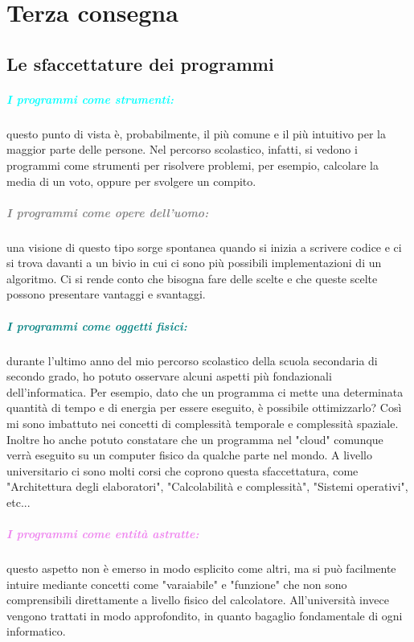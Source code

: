 \chapter{Terza consegna}

\section{Le sfaccettature dei programmi}

\paragraph{\textcolor{cyan}{I programmi come strumenti:}} 
questo punto di vista è, probabilmente, il più comune e il più intuitivo 
per la maggior parte delle persone. Nel percorso scolastico, infatti,
si vedono i programmi come strumenti per risolvere problemi, per esempio,
calcolare la media di un voto, oppure per svolgere un compito.

\paragraph{\textcolor{gray}{I programmi come opere dell'uomo:}}
una visione di questo tipo sorge spontanea quando si inizia a scrivere
codice e ci si trova davanti a un bivio in cui ci sono più possibili 
implementazioni di un algoritmo. Ci si rende conto che bisogna
fare delle scelte e che queste scelte possono presentare vantaggi e
svantaggi.

\paragraph{\textcolor{teal}{I programmi come oggetti fisici:}} 
durante l'ultimo anno del mio percorso scolastico della scuola
secondaria di secondo grado, ho potuto osservare alcuni aspetti più
fondazionali dell'informatica. Per esempio, dato che un programma ci
mette una determinata quantità di tempo e di energia per essere eseguito,
è possibile ottimizzarlo? Così mi sono imbattuto nei concetti di complessità
temporale e complessità spaziale. Inoltre ho anche potuto constatare 
che un programma nel "cloud" comunque verrà eseguito su un computer
fisico da qualche parte nel mondo. A livello universitario ci sono molti 
corsi che coprono questa sfaccettatura, come "Architettura degli elaboratori",
"Calcolabilità e complessità", "Sistemi operativi", etc...

\paragraph{\textcolor{violet}{I programmi come entità astratte:}}
questo aspetto non è emerso in modo esplicito come altri, ma si può 
facilmente intuire mediante concetti come "varaiabile" e "funzione"
che non sono comprensibili direttamente a livello fisico del calcolatore.
All'università invece vengono trattati in modo approfondito, in quanto
bagaglio fondamentale di ogni informatico.


